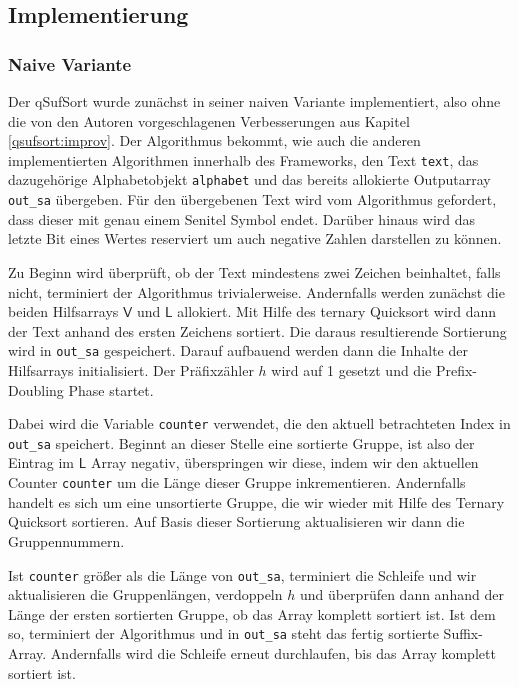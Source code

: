 \subsection{Implementierung}
\label{qsufsort:impl}
\subsubsection{Naive Variante}
Der qSufSort wurde zunächst in seiner naiven Variante implementiert, also ohne die von den Autoren vorgeschlagenen Verbesserungen aus Kapitel \ref{qsufsort:improv}. Der Algorithmus bekommt, wie auch die anderen implementierten Algorithmen innerhalb des Frameworks, den Text \texttt{text}, das dazugehörige Alphabetobjekt \texttt{alphabet} und das bereits allokierte Outputarray \texttt{out_sa} übergeben. Für den übergebenen Text wird vom Algorithmus gefordert, dass dieser mit genau einem Senitel Symbol endet. Darüber hinaus wird das letzte Bit eines Wertes reserviert um auch negative Zahlen darstellen zu können.

Zu Beginn wird überprüft, ob der Text mindestens zwei Zeichen beinhaltet, falls nicht, terminiert der Algorithmus trivialerweise. Andernfalls werden zunächst die beiden Hilfsarrays $\mathsf{V}$ und $\mathsf{L}$ allokiert. Mit Hilfe des ternary Quicksort wird dann der Text anhand des ersten Zeichens sortiert. Die daraus resultierende Sortierung wird in \texttt{out_sa} gespeichert. Darauf aufbauend werden dann die Inhalte der Hilfsarrays initialisiert. Der Präfixzähler $h$ wird auf 1 gesetzt und die Prefix-Doubling Phase startet. 

Dabei wird die Variable \texttt{counter} verwendet, die den aktuell betrachteten Index in \texttt{out_sa} speichert. Beginnt an dieser Stelle eine sortierte Gruppe, ist also der Eintrag im $\mathsf{L}$ Array negativ, überspringen wir diese, indem wir den aktuellen Counter \texttt{counter} um die Länge dieser Gruppe inkrementieren. Andernfalls handelt es sich um eine unsortierte Gruppe, die wir wieder mit Hilfe des Ternary Quicksort sortieren. Auf Basis dieser Sortierung aktualisieren wir dann die Gruppennummern.

Ist \texttt{counter} größer als die Länge von \texttt{out_sa}, terminiert die Schleife und wir aktualisieren die Gruppenlängen, verdoppeln $h$ und überprüfen dann anhand der Länge der ersten sortierten Gruppe, ob das Array komplett sortiert ist. Ist dem so, terminiert der Algorithmus und in \texttt{out_sa} steht das fertig sortierte Suffix-Array. Andernfalls wird die Schleife erneut durchlaufen, bis das Array komplett sortiert ist.

